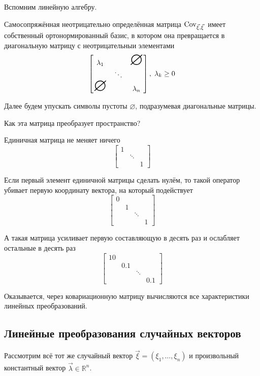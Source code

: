 \begin{remark}
    Вспомним линейную алгебру.

    Самосопряжённая неотрицательно определённая матрица $\mathrm{Cov}_{\vec{\xi}, \vec{\xi}}\,$ имеет
    собственный ортонормированный базис, в котором она превращается в
    диагональную матрицу с неотрицательныи элементами
    $$\begin{bmatrix}
        \lambda_1 & & \mbox{\Huge{$\varnothing$}} \\
         & \ddots &  \\
         \mbox{\Huge{$\varnothing$}} & & \lambda_n
    \end{bmatrix},\; \lambda_k \ge 0$$

    Далее будем упускать символы пустоты $\varnothing$,
    подразумевая диагональные матрицы.

    Как эта матрица преобразует пространство?

    Единичная матрица не меняет ничего
    $$\begin{bmatrix}
        1 & &\\
        & \ddots & \\
        & & 1
    \end{bmatrix}$$

    Если первый элемент единичной матрицы сделать нулём, то такой оператор
    убивает первую координату вектора, на который подействует
    $$\begin{bmatrix}
        0 & & & \\
        & 1 & & \\
        & & \ddots & \\
        & & & 1
    \end{bmatrix}$$

    А такая матрица усиливает первую составляющую в десять раз и
    ослабляет остальные в десять раз
    $$\begin{bmatrix}
        10 & & &\\
        & 0.1 & & \\
        & & \ddots & \\
        & & & 0.1
    \end{bmatrix}$$

    Оказывается, через ковариационную матрицу вычисляются все характеристики
    линейных преобразований.
\end{remark}

\subsection{Линейные преобразования случайных векторов}
Рассмотрим всё тот же случайный вектор $\vec{\xi} = \left( \xi_1, \dots, \xi_n
\right)$ и произвольный константный вектор $\vec{\lambda} \in \mathbb{R}^n$.

